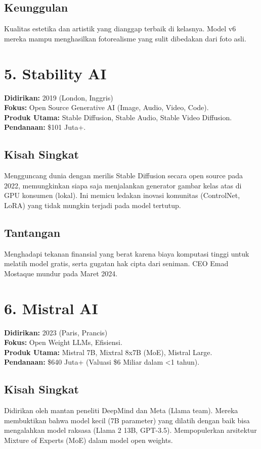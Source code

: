 \subsection*{Keunggulan}
Kualitas estetika dan artistik yang dianggap terbaik di kelasnya. Model v6 mereka mampu menghasilkan fotorealisme yang sulit dibedakan dari foto asli.

\section{5. Stability AI}
\textbf{Didirikan:} 2019 (London, Inggris) \\
\textbf{Fokus:} Open Source Generative AI (Image, Audio, Video, Code). \\
\textbf{Produk Utama:} Stable Diffusion, Stable Audio, Stable Video Diffusion. \\
\textbf{Pendanaan:} \$101 Juta+.

\subsection*{Kisah Singkat}
Mengguncang dunia dengan merilis Stable Diffusion secara open source pada 2022, memungkinkan siapa saja menjalankan generator gambar kelas atas di GPU konsumen (lokal). Ini memicu ledakan inovasi komunitas (ControlNet, LoRA) yang tidak mungkin terjadi pada model tertutup.

\subsection*{Tantangan}
Menghadapi tekanan finansial yang berat karena biaya komputasi tinggi untuk melatih model gratis, serta gugatan hak cipta dari seniman. CEO Emad Mostaque mundur pada Maret 2024.

\section{6. Mistral AI}
\textbf{Didirikan:} 2023 (Paris, Prancis) \\
\textbf{Fokus:} Open Weight LLMs, Efisiensi. \\
\textbf{Produk Utama:} Mistral 7B, Mixtral 8x7B (MoE), Mistral Large. \\
\textbf{Pendanaan:} \$640 Juta+ (Valuasi \$6 Miliar dalam <1 tahun).

\subsection*{Kisah Singkat}
Didirikan oleh mantan peneliti DeepMind dan Meta (Llama team). Mereka membuktikan bahwa model kecil (7B parameter) yang dilatih dengan baik bisa mengalahkan model raksasa (Llama 2 13B, GPT-3.5). Mempopulerkan arsitektur Mixture of Experts (MoE) dalam model open weights.

